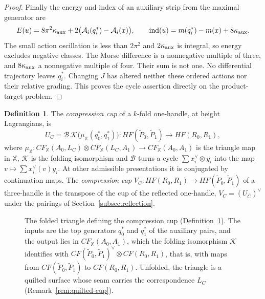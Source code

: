\documentclass[11pt]{amsart}
\theoremstyle{definition}
\newtheorem{definition}[theorem]{Definition}
\theoremstyle{remark}
\theoremstyle{plain}
\numberwithin{equation}{section}
\newcommand{\ind}{\operatorname{ind}}
\newcommand{\HF}{\mathit{HF}}
\newcommand{\CF}{\mathit{CF}}
\newcommand{\Msf}{\mathsf{M}}
\begin{document}
\begin{proof}
Finally the energy and index of an auxiliary strip from the
maximal generator are
\[
 E(u)=8\pi^2\kappa_{\rm aux}
          +2\bigl(\mathcal A_i(q_i^*)-\mathcal A_i(x)\bigr),
 \qquad
 \ind(u)=m(q_i^*)-m(x)+8\kappa_{\rm aux}.
\]
The small action oscillation is less than $2\pi^2$ and
$2\kappa_{\rm aux}$ is integral, so energy excludes negative
classes. The Morse difference is a nonnegative multiple of
three, and $8\kappa_{\rm aux}$ a nonnegative multiple of four.
Their sum is not one. No differential trajectory leaves $q_i^*$.
Changing $J$ has altered neither these ordered actions nor their
relative grading. This proves the cycle assertion directly on
the product-target problem.
\end{proof}

\begin{definition}\label{def:cup}
The \emph{compression cup} of a $k$-fold one-handle, at height Lagrangians, is
\[
U_C=\mathcal B\,\mathcal K\bigl(\mu_{\mathbb X}(q_0^*,q_1^*)\bigr)\colon
\HF(\widetilde P_0,\widetilde P_1)\to\HF(R_0,R_1),
\]
where $\mu_{\mathbb X}\colon\CF_{\mathbb X}(A_0,L_C)\otimes\CF_{\mathbb X}(L_C,A_1)\to\CF_{\mathbb X}(A_0,A_1)$ is the
triangle map in $\mathbb X$, $\mathcal K$ is the folding isomorphism and $\mathcal B$
turns a cycle $\sum x_i^\vee\otimes y_i$ into the map $v\mapsto\sum x_i^\vee(v)
y_i$. At other admissible presentations it is conjugated by continuation maps. The
\emph{compression cap} $V_C\colon\HF(R_0,R_1)\to\HF(\widetilde P_0,\widetilde
P_1)$ of a three-handle is the transpose of the cup of the reflected
one-handle, $V_C=(U_{\bar C})^\vee$ under the pairings of
Section~\ref{subsec:reflection}.
\end{definition}

\begin{figure}[ht]
\centering
{}
\caption{The folded triangle defining the compression cup
(Definition~\ref{def:cup}). The inputs are the top generators $q_0^*$ and $q_1^*$ of the
auxiliary pairs, and the output lies in $\CF_{\mathbb X}(A_0,A_1)$, which the folding isomorphism
$\mathcal K$ identifies with $\CF(\widetilde P_0,\widetilde P_1)^\vee\otimes\CF(R_0,R_1)$, that is,
with maps from $\CF(\widetilde P_0,\widetilde P_1)$ to $\CF(R_0,R_1)$. Unfolded, the triangle
is a quilted surface whose seam carries the correspondence $L_C$
(Remark~\ref{rem:quilted-cup}).}
\label{fig:folded-triangle}
\end{figure}
\end{document}
